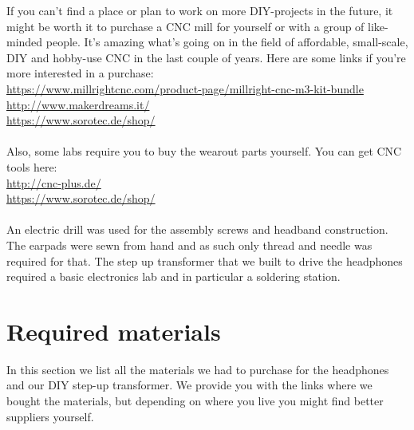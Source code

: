 \documentclass{article}
\begin{document}
If you can't find a place or plan to work on more DIY-projects in the future, it might be worth it to purchase a CNC mill for yourself or with a group of like-minded people. It's amazing what's going on in the field of affordable, small-scale, DIY and hobby-use CNC in the last couple of years. Here are some links if you're more interested in a purchase:\\
\url{https://www.millrightcnc.com/product-page/millright-cnc-m3-kit-bundle}\\
\url{http://www.makerdreams.it/}\\
\url{https://www.sorotec.de/shop/}\\
\\
Also, some labs require you to buy the wearout parts yourself. You can get CNC tools here:\\
\url{http://cnc-plus.de/}\\
\url{https://www.sorotec.de/shop/}\\
\\
An electric drill was used for the assembly screws and headband construction. The earpads were sewn from hand and as such only thread and needle was required for that. The step up transformer that we built to drive the headphones required a basic electronics lab and in particular a soldering station.

\section{Required materials}
\label{s:materials}
In this section we list all the materials we had to purchase for the headphones and our DIY step-up transformer. We provide you with the links where we bought the materials, but depending on where you live you might find better suppliers yourself.
\end{document}
